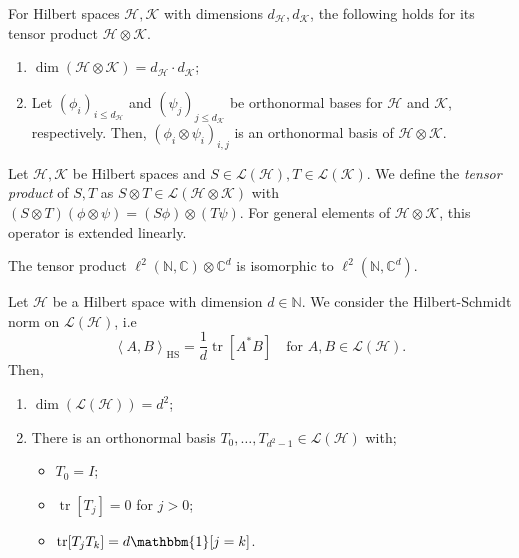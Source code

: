 \begin{fact}[]
    For Hilbert spaces \(\mathcal{H}, \mathcal{K}\) with dimensions \(d_{\mathcal{H}}, d_{\mathcal{K}}\), the following holds for its tensor product \(\mathcal{H} \otimes \mathcal{K}\). 
    \begin{enumerate}[1)]
      \item \(\operatorname{dim}(\mathcal{H} \otimes \mathcal{K})= d_{\mathcal{H}} \cdot d_{\mathcal{K}}\);
      \item Let \((\phi_i)_{i \leq d_{\mathcal{H}}}\) and \((\psi_j)_{j \leq d_{\mathcal{K}}}\) be orthonormal bases for \(\mathcal{H}\) and \(\mathcal{K}\), respectively. Then, \((\phi_i \otimes \psi_i)_{i,j}\) is an orthonormal basis of \(\mathcal{H} \otimes \mathcal{K}\).
    \end{enumerate}
\end{fact}


\begin{defn}
    Let \(\mathcal{H}, \mathcal{K}\) be Hilbert spaces and \(S \in \mathcal{L}(\mathcal{H}), T \in \mathcal{L}(\mathcal{K})\). We define the \emph{tensor product} of \(S,T\) as \(S \otimes T \in \mathcal{L}(\mathcal{H} \otimes \mathcal{K})\) with \((S \otimes T)(\phi \otimes \psi)= (S \phi) \otimes (T \psi)\). For general elements of \(\mathcal{H} \otimes \mathcal{K}\), this operator is extended linearly.
\end{defn}


\begin{exm}[]
    The tensor product \(\ell^{2}(\mathbb{N}, \mathbb{C}) \otimes \mathbb{C}^{d}\) is isomorphic to \(\ell^{2}(\mathbb{N}, \mathbb{C}^{d})\).
\end{exm}


\begin{lem}
  Let \(\mathcal{H}\) be a Hilbert space with dimension \(d \in \mathbb{N}\). We consider the Hilbert-Schmidt norm on \(\mathcal{L}(\mathcal{H})\), i.e 
  \[ \left\langle A,B \right\rangle_{\mathrm{HS}}= \frac{1}{d}\operatorname{tr}[A^{*}B] \quad \text{for \(A,B \in \mathcal{L}(\mathcal{H})\)}.\]
Then, 
\begin{enumerate}[1)]
  \item \(\operatorname{dim}(\mathcal{L}(\mathcal{H}))=d^2\);
  \item There is an orthonormal basis \(T_0, \dots, T_{d^2-1} \in \mathcal{L}(\mathcal{H})\) with;
    \begin{itemize}
      \item \(T_0=I\);
      \item \(\operatorname{tr}[T_j]=0\) for \(j >0\);
      \item \(\operatorname{tr}[T_j T_k]= d \mathbbm{1}[j=k]\).
    \end{itemize}
\end{enumerate}
\end{lem}


